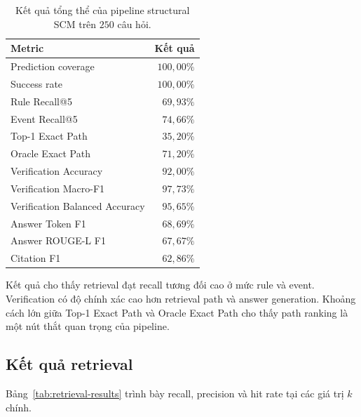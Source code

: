 \begin{table}[t]
    \centering
    \caption{Kết quả tổng thể của pipeline structural SCM trên \(250\) câu
    hỏi.}
    \label{tab:results}
    \begin{tabular}{lr}
        \hline
        \textbf{Metric} & \textbf{Kết quả} \\
        \hline
        Prediction coverage & \(100{,}00\%\) \\
        Success rate & \(100{,}00\%\) \\
        Rule Recall@5 & \(69{,}93\%\) \\
        Event Recall@5 & \(74{,}66\%\) \\
        Top-1 Exact Path & \(35{,}20\%\) \\
        Oracle Exact Path & \(71{,}20\%\) \\
        Verification Accuracy & \(92{,}00\%\) \\
        Verification Macro-F1 & \(97{,}73\%\) \\
        Verification Balanced Accuracy & \(95{,}65\%\) \\
        Answer Token F1 & \(68{,}69\%\) \\
        Answer ROUGE-L F1 & \(67{,}67\%\) \\
        Citation F1 & \(62{,}86\%\) \\
        \hline
    \end{tabular}
\end{table}

Kết quả cho thấy retrieval đạt recall tương đối cao ở mức rule và event.
Verification có độ chính xác cao hơn retrieval path và answer generation.
Khoảng cách lớn giữa Top-1 Exact Path và Oracle Exact Path cho thấy path
ranking là một nút thắt quan trọng của pipeline.

\subsection{Kết quả retrieval}

Bảng~\ref{tab:retrieval-results} trình bày recall, precision và hit rate tại
các giá trị \(k\) chính.

